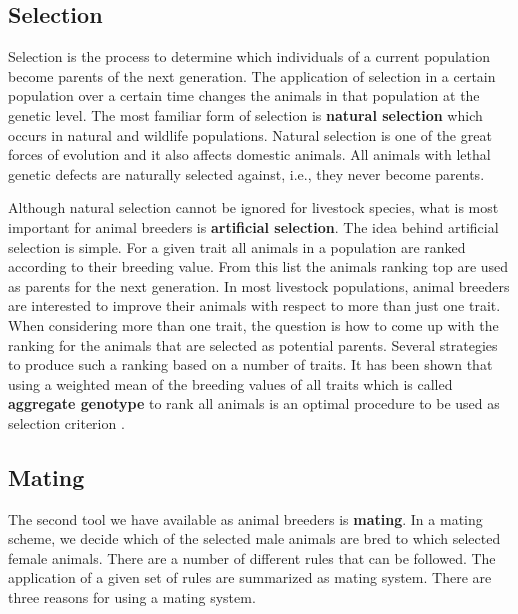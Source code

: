 \documentclass[
]{book}
\begin{document}
\hypertarget{selection}{%
\subsection{Selection}\label{selection}}

Selection is the process to determine which individuals of a current population become parents of the next generation. The application of selection in a certain population over a certain time changes the animals in that population at the genetic level. The most familiar form of selection is \textbf{natural selection} which occurs in natural and wildlife populations. Natural selection is one of the great forces of evolution and it also affects domestic animals. All animals with lethal genetic defects are naturally selected against, i.e., they never become parents.

Although natural selection cannot be ignored for livestock species, what is most important for animal breeders is \textbf{artificial selection}. The idea behind artificial selection is simple. For a given trait all animals in a population are ranked according to their breeding value. From this list the animals ranking top are used as parents for the next generation. In most livestock populations, animal breeders are interested to improve their animals with respect to more than just one trait. When considering more than one trait, the question is how to come up with the ranking for the animals that are selected as potential parents. Several strategies to produce such a ranking based on a number of traits. It has been shown that using a weighted mean of the breeding values of all traits which is called \textbf{aggregate genotype} to rank all animals is an optimal procedure to be used as selection criterion \citep{Hazel1943}.

\hypertarget{mating}{%
\subsection{Mating}\label{mating}}

The second tool we have available as animal breeders is \textbf{mating}. In a mating scheme, we decide which of the selected male animals are bred to which selected female animals. There are a number of different rules that can be followed. The application of a given set of rules are summarized as mating system. There are three reasons for using a mating system.
\end{document}
